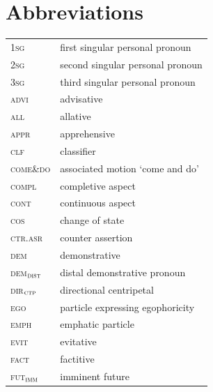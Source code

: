 \documentclass[output=paper,colorlinks,citecolor=brown, language=chinese]{langscibook}
\begin{document}
\section*{Abbreviations}
\begin{tabularx}{.5\textwidth}{@{}lQ@{}}
\textsc{1sg} & first singular personal pronoun \\
\textsc{2sg} & second singular personal pronoun \\
\textsc{3sg} & third singular personal pronoun \\
\textsc{advi} & advisative \\
\textsc{all} & allative \\
\textsc{appr} & apprehensive \\
\textsc{clf} & classifier \\
\textsc{come\&do} & associated motion `come and do'\\
\textsc{compl} & completive aspect \\
\textsc{cont} & continuous aspect \\
\textsc{cos} & change of state \\
\textsc{ctr.asr} & counter assertion \\
\textsc{dem} & demonstrative \\
\textsc{dem}$_{\textsc{dist}}$ & distal demonstrative pronoun \\
\textsc{dir$_{\textsc{ctp}}$} & directional centripetal \\
\textsc{ego} & particle expressing egophoricity \\
\textsc{emph} & emphatic particle \\
\textsc{evit} & evitative\\
\textsc{fact} & factitive \\
\textsc{fut}$_{\textsc{imm}}$ & imminent future \end{tabularx}%
\end{document}
